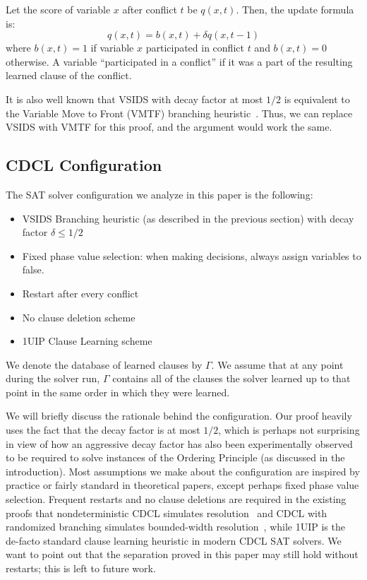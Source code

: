 \documentclass[a4paper,UKenglish,cleveref, autoref, thm-restate]{lipics-v2021}
\begin{document}
Let the score of variable $x$ after conflict $t$ be $q(x, t)$. Then, the update formula is:
$$q(x, t) = b(x, t) + \delta q(x, t - 1)$$
where $b(x, t) = 1$ if variable $x$ participated in conflict $t$ and $b(x, t) = 0$ otherwise. A variable ``participated in a conflict'' if it was a part of the resulting learned clause of the conflict.

It is also well known that VSIDS with decay factor at most $1/2$ is equivalent to the Variable Move to Front (VMTF) branching heuristic~\cite{Rya04Efficient,DBLP:conf/sat/BiereF15}. Thus, we can replace VSIDS with VMTF for this proof, and the argument would work the same. 


\subsection{CDCL Configuration}
\label{sec:configuration}

The SAT solver configuration we analyze in this paper is the following:
\begin{itemize}
    \item VSIDS Branching heuristic (as described in the previous section) with decay factor $\delta \leq 1/2$
    \item Fixed phase value selection: when making decisions, always assign variables to false.
    \item Restart after every conflict
    \item No clause deletion scheme
    \item 1UIP Clause Learning scheme
\end{itemize}

We denote the database of learned clauses by $\Gamma$. We assume that at any point during the solver run, $\Gamma$ contains all of the clauses the solver learned up to that point in the same order in which they were learned. 

We will briefly discuss the rationale behind the configuration. Our proof heavily uses the fact that the decay factor is at most $1/2$, which is perhaps not surprising in view of how an aggressive decay factor has also been experimentally observed to be required to solve instances of the Ordering Principle (as discussed in the introduction). Most assumptions we make about the configuration are inspired by practice or fairly standard in theoretical papers, except perhaps fixed phase value selection. Frequent restarts and no clause deletions are required in the existing proofs that nondeterministic CDCL simulates resolution~\cite{simres} and CDCL with randomized branching simulates bounded-width resolution~\cite{manyrestarts}, while 1UIP is the de-facto standard clause learning heuristic in modern CDCL SAT solvers. We want to point out that the separation proved in this paper may still hold without restarts; this is left to future work.
\end{document}
